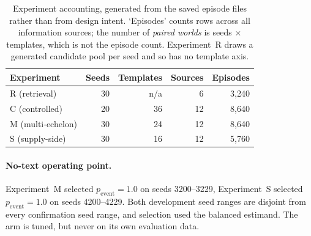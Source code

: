 \begin{table}[!ht]
\caption{Experiment accounting, generated from the saved episode files rather
than from design intent. `Episodes' counts rows across all information sources;
the number of \emph{paired worlds} is seeds $\times$ templates, which is not the
episode count. Experiment~R draws a generated candidate pool per seed and so has
no template axis.}
\label{tab:accounting}
\centering\small
\begin{tabular}{lrrrr}
\toprule
Experiment & Seeds & Templates & Sources & Episodes \\
\midrule
R (retrieval) & 30 & n/a & 6 & 3,240 \\
C (controlled) & 20 & 36 & 12 & 8,640 \\
M (multi-echelon) & 30 & 24 & 12 & 8,640 \\
S (supply-side) & 30 & 16 & 12 & 5,760 \\
\bottomrule
\end{tabular}
\end{table}

\paragraph{No-text operating point.}
Experiment~M selected $p_{\mathrm{event}}=1.0$ on seeds 3200--3229, Experiment~S selected $p_{\mathrm{event}}=1.0$ on seeds 4200--4229. Both development seed ranges are disjoint from every confirmation seed range, and selection used the balanced estimand. The arm is tuned, but never on its own evaluation data.
